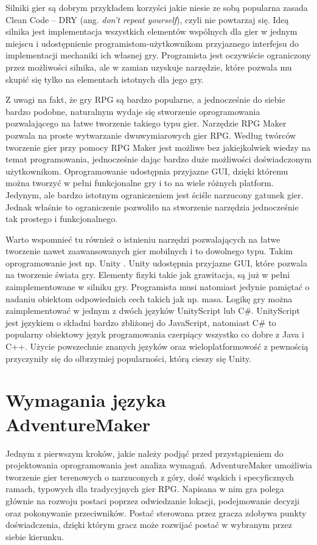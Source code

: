 \documentclass[openright]{xmgr}
\begin{document}
Silniki gier są dobrym przykładem korzyści jakie niesie ze sobą popularna zasada Clean Code \cite{CleanCode:2005} -- DRY (ang. \textit{don't repeat yourself}), czyli nie powtarzaj się. Ideą silnika jest implementacja wszystkich elementów wspólnych dla gier w jednym miejscu i udostępnienie programistom-użytkownikom przyjaznego interfejsu do implementacji mechaniki ich własnej gry. Programista jest oczywiście ograniczony przez możliwości silnika, ale w zamian uzyskuje narzędzie, które pozwala mu skupić się tylko na elementach istotnych dla jego gry.

Z uwagi na fakt, że gry RPG są bardzo popularne, a jednocześnie do siebie bardzo podobne, naturalnym wydaje się stworzenie oprogramowania pozwalającego na łatwe tworzenie takiego typu gier. Narzędzie RPG Maker \cite{RPGMaker:2017:Doc} pozwala na proste wytwarzanie dwuwymiarowych gier RPG. Według twórców tworzenie gier przy pomocy RPG Maker jest możliwe bez jakiejkolwiek wiedzy na temat programowania, jednocześnie dając bardzo duże możliwości doświadczonym użytkownikom. Oprogramowanie udostępnia przyjazne GUI, dzięki któremu można tworzyć w pełni funkcjonalne gry i to na wiele różnych platform. Jedynym, ale bardzo istotnym ograniczeniem jest ściśle narzucony gatunek gier. Jednak właśnie to ograniczenie pozwoliło na stworzenie narzędzia jednocześnie tak prostego i funkcjonalnego. 

Warto wspomnieć tu również o istnieniu narzędzi pozwalających na łatwe tworzenie nawet zaawansowanych gier mobilnych i to dowolnego typu. Takim oprogramowanie jest np. Unity \cite{Unity3D:2017:Doc}. Unity udostępnia przyjazne GUI, które pozwala na tworzenie świata gry. Elementy fizyki takie jak grawitacja, są już w pełni zaimplementowane w silniku gry. Programista musi natomiast jedynie pamiętać o nadaniu obiektom odpowiednich cech takich jak np. masa. Logikę gry można zaimplementować w jednym z dwóch języków UnityScript lub C\#. UnityScript jest językiem o składni bardzo zbliżonej do JavaScript, natomiast C\# to popularny obiektowy język programowania czerpiący wszystko co dobre z Java i C++. Użycie powszechnie znanych języków oraz wieloplatformowość z pewnością przyczyniły się do olbrzymiej popularności, którą cieszy się Unity.


\chapter{Wymagania języka AdventureMaker}

Jednym z pierwszym kroków, jakie należy podjąć przed przystąpieniem do projektowania oprogramowania jest analiza wymagań. AdventureMaker umożliwia tworzenie gier terenowych o narzuconych z góry, dość wąskich i specyficznych ramach, typowych dla tradycyjnych gier RPG. Napisana w nim gra polega głównie na rozwoju postaci poprzez odwiedzanie lokacji, podejmowanie decyzji oraz pokonywanie przeciwników. Postać sterowana przez gracza zdobywa punkty doświadczenia, dzięki którym gracz może rozwijać postać w wybranym przez siebie kierunku. 
\end{document}

